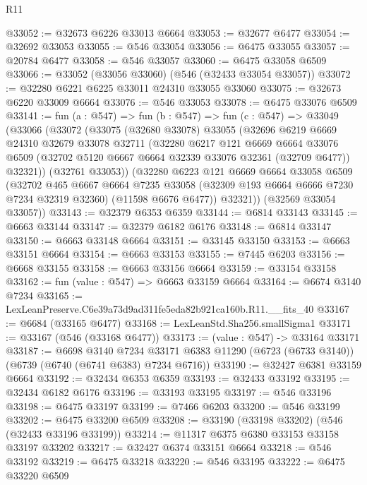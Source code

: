 \begin{lexlean}{R11}
\begin{coremodule}
@33052 := @32673 @6226 @33013 @6664
@33053 := @32677 @6477
@33054 := @32692 @33053
@33055 := @546 @33054
@33056 := @6475 @33055
@33057 := @20784 @6477
@33058 := @546 @33057
@33060 := @6475 @33058 @6509
@33066 := @33052 (@33056 @33060) (@546 (@32433 @33054 @33057))
@33072 := @32280 @6221 @6225 @33011 @24310 @33055 @33060
@33075 := @32673 @6220 @33009 @6664
@33076 := @546 @33053
@33078 := @6475 @33076 @6509
@33141 := fun (a : @547) =>
  fun (b : @547) =>
  fun (c : @547) =>
  @33049
    (@33066
      (@33072
        (@33075
          (@32680 @33078)
          @33055
          (@32696
            @6219
            @6669
            @24310
            @32679
            @33078
            @32711
            (@32280
              @6217
              @121
              @6669
              @6664
              @33076
              @6509
              (@32702 @5120 @6667 @6664 @32339 @33076 @32361 (@32709 @6477))
              @32321))
          (@32761 @33053))
        (@32280
          @6223
          @121
          @6669
          @6664
          @33058
          @6509
          (@32702
            @465
            @6667
            @6664
            @7235
            @33058
            (@32309 @193 @6664 @6666 @7230 @7234 @32319 @32360)
            (@11598 @6676 @6477))
          @32321))
      (@32569 @33054 @33057))
@33143 := @32379 @6353 @6359
@33144 := @6814 @33143
@33145 := @6663 @33144
@33147 := @32379 @6182 @6176
@33148 := @6814 @33147
@33150 := @6663 @33148 @6664
@33151 := @33145 @33150
@33153 := @6663 @33151 @6664
@33154 := @6663 @33153
@33155 := @7445 @6203
@33156 := @6668 @33155
@33158 := @6663 @33156 @6664
@33159 := @33154 @33158
@33162 := fun (value : @547) => @6663 @33159 @6664
@33164 := @6674 @3140 @7234
@33165 := LexLeanPreserve.C6e39a73d9ad311fe5eda82b921ca160b.R11.__fits_40
@33167 := @6684 (@33165 @6477)
@33168 := LexLeanStd.Sha256.smallSigma1
@33171 := @33167 (@546 (@33168 @6477))
@33173 := (value : @547) -> @33164 @33171
@33187 := @6698
    @3140
    @7234
    @33171
    @6383
    @11290
    (@6723 (@6733 @3140))
    (@6739 (@6740 (@6741 @6383) @7234 @6716))
@33190 := @32427 @6381 @33159 @6664
@33192 := @32434 @6353 @6359
@33193 := @32433 @33192
@33195 := @32434 @6182 @6176
@33196 := @33193 @33195
@33197 := @546 @33196
@33198 := @6475 @33197
@33199 := @7466 @6203
@33200 := @546 @33199
@33202 := @6475 @33200 @6509
@33208 := @33190 (@33198 @33202) (@546 (@32433 @33196 @33199))
@33214 := @11317 @6375 @6380 @33153 @33158 @33197 @33202
@33217 := @32427 @6374 @33151 @6664
@33218 := @546 @33192
@33219 := @6475 @33218
@33220 := @546 @33195
@33222 := @6475 @33220 @6509

\end{coremodule}
\end{lexlean}
